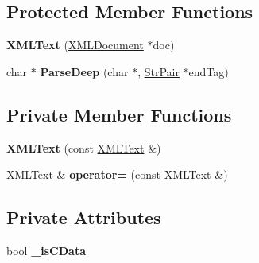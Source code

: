 \subsection*{Protected Member Functions}
\begin{DoxyCompactItemize}
\item 
\hypertarget{classtinyxml2_1_1_x_m_l_text_ad9f46d70e61e5386ead93728d8b90267}{}{\bfseries X\+M\+L\+Text} (\hyperlink{classtinyxml2_1_1_x_m_l_document}{X\+M\+L\+Document} $\ast$doc)\label{classtinyxml2_1_1_x_m_l_text_ad9f46d70e61e5386ead93728d8b90267}

\item 
\hypertarget{classtinyxml2_1_1_x_m_l_text_a29f626cc5bf9d536e21fe033ecd5994a}{}char $\ast$ {\bfseries Parse\+Deep} (char $\ast$, \hyperlink{classtinyxml2_1_1_str_pair}{Str\+Pair} $\ast$end\+Tag)\label{classtinyxml2_1_1_x_m_l_text_a29f626cc5bf9d536e21fe033ecd5994a}

\end{DoxyCompactItemize}
\subsection*{Private Member Functions}
\begin{DoxyCompactItemize}
\item 
\hypertarget{classtinyxml2_1_1_x_m_l_text_a002156e1f61ee6d48e5368b7cca25582}{}{\bfseries X\+M\+L\+Text} (const \hyperlink{classtinyxml2_1_1_x_m_l_text}{X\+M\+L\+Text} \&)\label{classtinyxml2_1_1_x_m_l_text_a002156e1f61ee6d48e5368b7cca25582}

\item 
\hypertarget{classtinyxml2_1_1_x_m_l_text_ad8c9f398d92fa472e213b89d8483ae8f}{}\hyperlink{classtinyxml2_1_1_x_m_l_text}{X\+M\+L\+Text} \& {\bfseries operator=} (const \hyperlink{classtinyxml2_1_1_x_m_l_text}{X\+M\+L\+Text} \&)\label{classtinyxml2_1_1_x_m_l_text_ad8c9f398d92fa472e213b89d8483ae8f}

\end{DoxyCompactItemize}
\subsection*{Private Attributes}
\begin{DoxyCompactItemize}
\item 
\hypertarget{classtinyxml2_1_1_x_m_l_text_aae1a8b4117e8c8bb107900a0560d5ab5}{}bool {\bfseries \+\_\+is\+C\+Data}\label{classtinyxml2_1_1_x_m_l_text_aae1a8b4117e8c8bb107900a0560d5ab5}

\end{DoxyCompactItemize}
